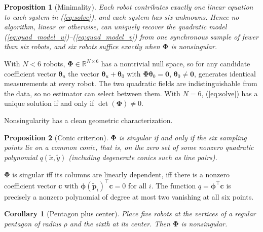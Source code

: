 \documentclass[lettersize,journal]{IEEEtran}
\newtheorem{proposition}{Proposition}
\newtheorem{corollary}{Corollary}
\begin{document}
\begin{proposition}[Minimality]
\label{prop:minimality}
Each robot contributes exactly one linear equation to each system in
(\ref{eq:solve}), and each system has six unknowns. Hence no algorithm,
linear or otherwise, can uniquely recover the quadratic model
(\ref{eq:quad_model_u})--(\ref{eq:quad_model_v}) from one synchronous
sample of fewer than six robots, and six robots suffice exactly when
$\boldsymbol{\Phi}$ is nonsingular.
\end{proposition}

\begin{IEEEproof}
With $N < 6$ robots, $\boldsymbol{\Phi} \in \mathbb{R}^{N \times 6}$ has
a nontrivial null space, so for any candidate coefficient vector
$\boldsymbol{\theta}_u$ the vector $\boldsymbol{\theta}_u +
\boldsymbol{\theta}_0$ with $\boldsymbol{\Phi}\boldsymbol{\theta}_0 =
\mathbf{0}$, $\boldsymbol{\theta}_0 \neq \mathbf{0}$, generates identical
measurements at every robot. The two quadratic fields are
indistinguishable from the data, so no estimator can select between
them. With $N = 6$, (\ref{eq:solve}) has a unique solution if and only if
$\det(\boldsymbol{\Phi}) \neq 0$.
\end{IEEEproof}

Nonsingularity has a clean geometric characterization.

\begin{proposition}[Conic criterion]
\label{prop:conic}
$\boldsymbol{\Phi}$ is singular if and only if the six sampling points
lie on a common conic, that is, on the zero set of some nonzero quadratic
polynomial $q(\tilde{x}, \tilde{y})$ (including degenerate conics such as
line pairs).
\end{proposition}

\begin{IEEEproof}
$\boldsymbol{\Phi}$ is singular iff its columns are linearly dependent,
iff there is a nonzero coefficient vector $\mathbf{c}$ with
$\boldsymbol{\phi}(\tilde{\mathbf{p}}_i)^\top \mathbf{c} = 0$ for all
$i$. The function $q = \boldsymbol{\phi}^\top \mathbf{c}$ is precisely a
nonzero polynomial of degree at most two vanishing at all six points.
\end{IEEEproof}

\begin{corollary}[Pentagon plus center]
\label{cor:pentagon}
Place five robots at the vertices of a regular pentagon of radius $\rho$
and the sixth at its center. Then $\boldsymbol{\Phi}$ is nonsingular.
\end{corollary}
\end{document}

